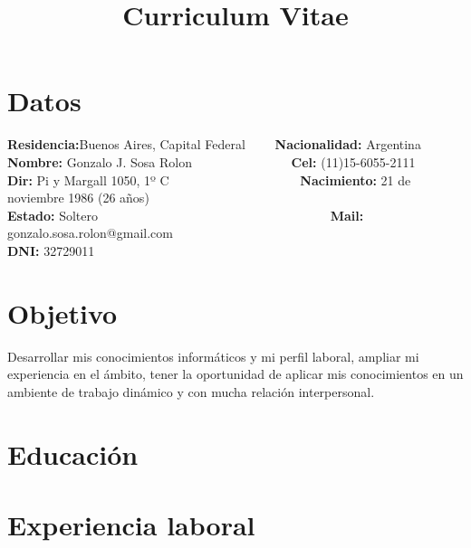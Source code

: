 \documentclass[11pt,a4paper,sans]{moderncv} %
\title{Curriculum Vitae}
\begin{document}
\makecvtitle %


\section{Datos}
	\textbf{Residencia:}Buenos Aires, Capital Federal \ \ \ \ \textbf{Nacionalidad:} Argentina\\
	\textbf{Nombre:} Gonzalo J. Sosa Rolon \ \ \ \ \ \ \ \ \ \ \ \ \ \ \ \textbf{Cel:} (11)15-6055-2111\\
	\textbf{Dir:} Pi y Margall 1050, 1º C \ \ \ \ \ \ \ \ \ \ \ \ \ \ \ \ \ \ \  \ \textbf{Nacimiento:} 21 de noviembre 1986 (26 años)\\
	\textbf{Estado:} Soltero \ \ \ \ \ \ \ \ \ \ \ \ \ \ \ \ \  \ \ \ \ \ \ \ \ \ \ \ \ \ \ \ \ \ \ \  \textbf{Mail:} gonzalo.sosa.rolon@gmail.com\\
	\textbf{DNI:} 32729011\\	

\section{Objetivo}

Desarrollar mis conocimientos informáticos y mi perfil laboral, ampliar mi experiencia en el ámbito, tener la oportunidad de aplicar mis conocimientos en un ambiente de trabajo dinámico y con mucha relación interpersonal.

\section{Educación}


\section{Experiencia laboral}
\end{document}
